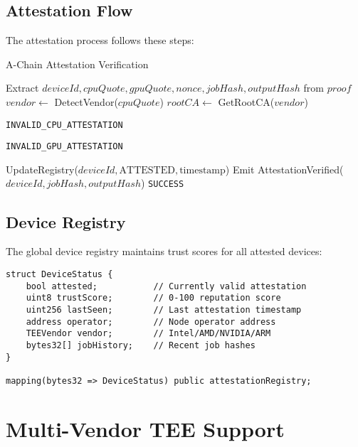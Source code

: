 \documentclass[11pt,a4paper]{article}
\begin{document}
\subsection{Attestation Flow}

The attestation process follows these steps:

\begin{algorithm}[H]
\caption{A-Chain Attestation Verification}
\begin{algorithmic}[1]
    \State Extract $deviceId, cpuQuote, gpuQuote, nonce, jobHash, outputHash$ from $proof$
    \State $vendor \gets$ DetectVendor($cpuQuote$)
    \State $rootCA \gets$ GetRootCA($vendor$)
    
        \State \Return \texttt{INVALID\_CPU\_ATTESTATION}
    \EndIf
    
            \State \Return \texttt{INVALID\_GPU\_ATTESTATION}
        \EndIf
    \EndIf
    
    \State UpdateRegistry($deviceId, \text{ATTESTED}, \text{timestamp}$)
    \State Emit AttestationVerified($deviceId, jobHash, outputHash$)
    \State \Return \texttt{SUCCESS}
\EndFunction
\end{algorithmic}
\end{algorithm}

\subsection{Device Registry}

The global device registry maintains trust scores for all attested devices:

\begin{lstlisting}[language=Solidity, basicstyle=\small\ttfamily]
struct DeviceStatus {
    bool attested;           // Currently valid attestation
    uint8 trustScore;        // 0-100 reputation score
    uint256 lastSeen;        // Last attestation timestamp
    address operator;        // Node operator address
    TEEVendor vendor;        // Intel/AMD/NVIDIA/ARM
    bytes32[] jobHistory;    // Recent job hashes
}

mapping(bytes32 => DeviceStatus) public attestationRegistry;
\end{lstlisting}

\section{Multi-Vendor TEE Support}
\end{document}
